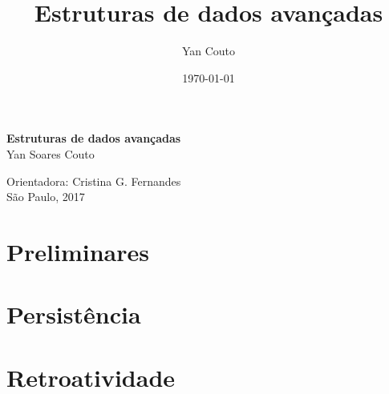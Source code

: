 \documentclass[11pt,oneside,a4paper, openany]{book}
\title{Estruturas de dados avançadas}
\author{Yan Couto}
\date{\today}
\begin{document}
\frontmatter 

\thispagestyle{empty}
\begin{center}
	\vspace*{2.3cm}
	\textbf{\huge{Estruturas de dados avançadas}}\\

	\vspace*{1cm}
	\Large{Yan Soares Couto}

	\vskip 1.8cm
	Orientadora: Cristina G. Fernandes\\

	\vspace{\fill}
	\normalsize{São Paulo, 2017}
\end{center}

\setcounter{tocdepth}{1}

\begingroup
\let\cleardoublepage\clearpage
\tableofcontents
\endgroup

\mainmatter
{}

\part{Preliminares}


\part{Persistência}











\part{Retroatividade}






\end{document}

